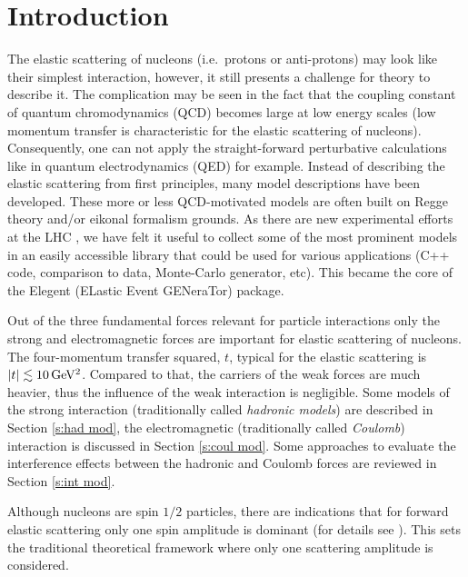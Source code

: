 \documentclass[preprint,12pt]{elsarticle}
\def\un#1{{\,\rm #1}}
\begin{document}
\newpage



\section{Introduction}\label{s:inc}

The elastic scattering of nucleons (i.e.~protons or anti-protons) may look like their simplest interaction, however, it still presents a challenge for theory to describe it. The complication may be seen in the fact that the coupling constant of quantum chromodynamics (QCD) becomes large at low energy scales (low momentum transfer is characteristic for the elastic scattering of nucleons). Consequently, one can not apply the straight-forward perturbative calculations like in quantum electrodynamics (QED) for example. Instead of describing the elastic scattering from first principles, many model descriptions have been developed. These more or less QCD-motivated models are often built on Regge theory and/or eikonal formalism grounds. As there are new experimental efforts at the LHC \cite{totem,alfa}, we have felt it useful to collect some of the most prominent models in an easily accessible library that could be used for various applications (C++ code, comparison to data, Monte-Carlo generator, etc). This became the core of the Elegent (ELastic Event GENeraTor) package.

Out of the three fundamental forces relevant for particle interactions only the strong and electromagnetic forces are important for elastic scattering of nucleons. The four-momentum transfer squared, $t$, typical for the elastic scattering is $|t| \lesssim 10\un{GeV^2}$. Compared to that, the carriers of the weak forces are much heavier, thus the influence of the weak interaction is negligible. Some models of the strong interaction (traditionally called {\em hadronic models}) are described in Section \ref{s:had mod}, the electromagnetic (traditionally called {\em Coulomb}) interaction is discussed in Section \ref{s:coul mod}. Some approaches to evaluate the interference effects between the hadronic and Coulomb forces are reviewed in Section \ref{s:int mod}.

Although nucleons are spin $1/2$ particles, there are indications that for forward elastic scattering only one spin amplitude is dominant (for details see \cite[section 1]{jan_thesis}). This sets the traditional theoretical framework where only one scattering amplitude is considered.
\end{document}
